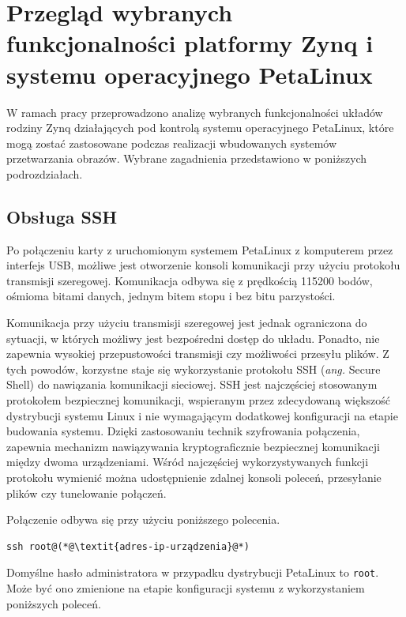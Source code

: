 \chapter{Przegląd wybranych funkcjonalności platformy Zynq i systemu operacyjnego PetaLinux}
\label{cha:functionalities}

W ramach pracy przeprowadzono analizę wybranych funkcjonalności układów rodziny Zynq działających pod kontrolą systemu operacyjnego PetaLinux, które mogą zostać zastosowane podczas realizacji wbudowanych systemów przetwarzania obrazów. 
Wybrane zagadnienia przedstawiono w poniższych podrozdziałach.

\section{Obsługa SSH}
\label{sec:ssh}

Po połączeniu karty z uruchomionym systemem PetaLinux z komputerem przez interfejs USB, możliwe jest otworzenie konsoli komunikacji przy użyciu protokołu transmisji szeregowej.
Komunikacja odbywa się z prędkością 115200 bodów, ośmioma bitami danych, jednym bitem stopu i bez bitu parzystości. 

Komunikacja przy użyciu transmisji szeregowej jest jednak ograniczona do sytuacji, w których możliwy jest bezpośredni dostęp do układu. 
Ponadto, nie zapewnia wysokiej przepustowości transmisji czy możliwości przesyłu plików. 
Z tych powodów, korzystne staje się wykorzystanie protokołu SSH (\emph{ang.} Secure Shell) do nawiązania komunikacji sieciowej. 
SSH jest najczęściej stosowanym protokołem bezpiecznej komunikacji, wspieranym przez zdecydowaną większość dystrybucji systemu Linux i nie wymagającym dodatkowej konfiguracji na etapie budowania systemu. 
Dzięki zastosowaniu technik szyfrowania połączenia, zapewnia mechanizm nawiązywania kryptograficznie bezpiecznej komunikacji między dwoma urządzeniami. 
Wśród najczęściej wykorzystywanych funkcji protokołu wymienić można udostępnienie zdalnej konsoli poleceń, przesyłanie plików czy tunelowanie połączeń.

Połączenie odbywa się przy użyciu poniższego polecenia.

\begin{lstlisting}[breaklines=true]
ssh root@(*@\textit{adres-ip-urządzenia}@*) 
\end{lstlisting}

Domyślne hasło administratora w przypadku dystrybucji PetaLinux to \texttt{root}. 
Może być ono zmienione na etapie konfiguracji systemu z wykorzystaniem poniższych poleceń.

